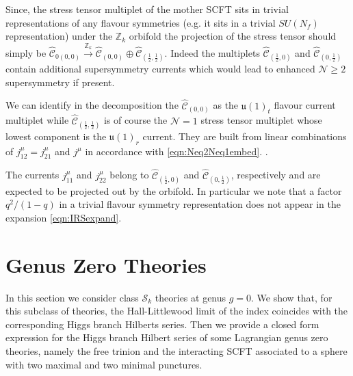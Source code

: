 \documentclass[main.tex]{subfiles}
\begin{document}
Since, the stress tensor multiplet of the mother SCFT sits in trivial representations of any flavour symmetries (e.g. it sits in a trivial $SU(N_f)$ representation) under the $\mathbb{Z}_k$ orbifold the projection of the stress tensor should simply be $\hat{\mathcal{C}}_{0(0,0)}\xrightarrow{\mathbb{Z}_k}\hat{\mathcal{C}}_{(0,0)}\oplus\hat{\mathcal{C}}_{\left(\frac{1}{2},\frac{1}{2}\right)}$. Indeed the multiplets $\hat{\mathcal{C}}_{\left(\frac{1}{2},0\right)}$ and $\hat{\mathcal{C}}_{\left(0,\frac{1}{2}\right)}$ contain additional supersymmetry currents which would lead to enhanced $\mathcal{N}\geq2$ supersymmetry if present. 

We can identify in the decomposition the $\hat{\mathcal{C}}_{(0,0)}$ as the $\mathfrak{u}(1)_t$ flavour current multiplet while $\hat{\mathcal{C}}_{\left(\frac{1}{2},\frac{1}{2}\right)}$ is of course the $\mathcal{N}=1$ stress tensor multiplet whose lowest component is the $\mathfrak{u}(1)_r$ current. They are built from linear combinations of $j^{\mu}_{12}=j^{\mu}_{21}$ and $j^{\mu}$ in accordance with \eqref{eqn:Neq2Neq1embed}. .

The currents $j^{\mu}_{11}$ and $j^{\mu}_{22}$ belong to $\hat{\mathcal{C}}_{\left(\frac{1}{2},0\right)}$ and $\hat{\mathcal{C}}_{\left(0,\frac{1}{2}\right)}$, respectively and are expected to be projected out by the orbifold. In particular we note that a factor $q^2/(1-q)$ in a trivial flavour symmetry representation does not appear in the expansion \eqref{eqn:IRSexpand}.

\section{Genus Zero Theories}\label{sec:genuszero}
In this section we consider class $\mathcal{S}_k$ theories at genus $g=0$. We show that, for this subclass of theories, the Hall-Littlewood limit of the index coincides with the corresponding Higgs branch Hilberts series. Then we provide a closed form expression for the Higgs branch Hilbert series of some Lagrangian genus zero theories, namely the free trinion and the interacting SCFT associated to a sphere with two maximal and two minimal punctures.
\end{document}

